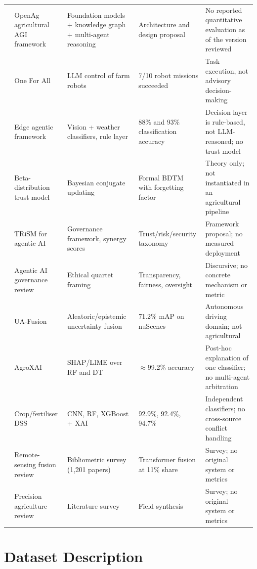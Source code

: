 \documentclass[preprint,12pt]{elsarticle}
\begin{document}
\begin{table}[H]
{\begin{tabular}{@{}p{0.55cm}p{2.9cm}p{3.0cm}p{3.35cm}p{3.5cm}@{}}
\cite{thudumu2026openag} & OpenAg agricultural AGI framework & Foundation models + knowledge graph + multi-agent reasoning & Architecture and design proposal & No reported quantitative evaluation as of the version reviewed \\
\cite{zuzuarregui2025oneforall} & One For All & LLM control of farm robots & 7/10 robot missions succeeded & Task execution, not advisory decision-making \\
\cite{tariq2025edge} & Edge agentic framework & Vision + weather classifiers, rule layer & 88\% and 93\% classification accuracy & Decision layer is rule-based, not LLM-reasoned; no trust model \\
\cite{liu2020beta} & Beta-distribution trust model & Bayesian conjugate updating & Formal BDTM with forgetting factor & Theory only; not instantiated in an agricultural pipeline \\
\cite{raza2025trism} & TRiSM for agentic AI & Governance framework, synergy scores & Trust/risk/security taxonomy & Framework proposal; no measured deployment \\
\cite{gavai2025agentic} & Agentic AI governance review & Ethical quartet framing & Transparency, fairness, oversight & Discursive; no concrete mechanism or metric \\
\cite{shao2025uafusion} & UA-Fusion & Aleatoric/epistemic uncertainty fusion & 71.2\% mAP on nuScenes & Autonomous driving domain; not agricultural \\
\cite{turgut2024agroxai} & AgroXAI & SHAP/LIME over RF and DT & $\approx$99.2\% accuracy & Post-hoc explanation of one classifier; no multi-agent arbitration \\
\cite{swati2026dss} & Crop/fertiliser DSS & CNN, RF, XGBoost + XAI & 92.9\%, 92.4\%, 94.7\% & Independent classifiers; no cross-source conflict handling \\
\cite{saki2024fusion} & Remote-sensing fusion review & Bibliometric survey (1{,}201 papers) & Transformer fusion at 11\% share & Survey; no original system or metrics \\
\cite{pai2025review} & Precision agriculture review & Literature survey & Field synthesis & Survey; no original system or metrics \\
\bottomrule
\end{tabular}
}
\end{table}

\section{Dataset Description}
\label{sec:dataset}
\end{document}
